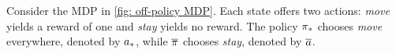 




Consider the MDP in \autoref{fig: off-policy MDP}. Each state offers two actions: \textit{move} yields a reward of one and \textit{stay} yields no reward. The policy ${\pi}_*$ chooses \textit{move} everywhere, denoted by ${a}_*$, while $\overline{\pi}$ chooses \textit{stay}, denoted by $\overline{a}$.

